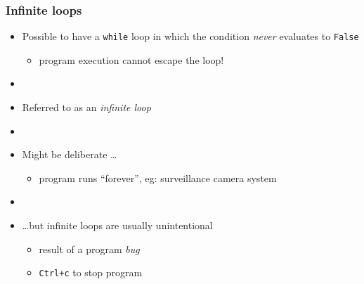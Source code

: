 \documentclass[english,14pt]{beamer}
\newcommand\red[1]{{\color{red} #1}}
\begin{document}
\begin{frame}[fragile]

\frametitle{Infinite loops}

\begin{itemize}
	\item Possible to have a \texttt{while} loop in which the condition \emph{never} evaluates to \texttt{False}
	\begin{itemize}
		\item program execution cannot escape the loop!
	\end{itemize}
	
	\item[]
	
	\item Referred to as an \red{\emph{infinite loop}}
	
	\item[]
	
	\item Might be deliberate \ldots
	\begin{itemize}
		\item program runs ``forever'', eg: surveillance camera system
	\end{itemize}
	
	\item[]
	\item \ldots but infinite loops are usually unintentional
	\begin{itemize}
		\item result of a program \red{\emph{bug}}
		\item \texttt{Ctrl+c} to stop program
	\end{itemize}
	
\end{itemize}

\end{frame}

%
%
%

\end{document}
